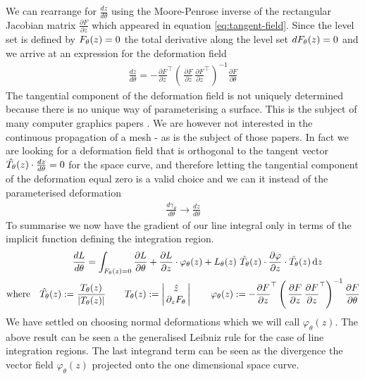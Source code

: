 We can rearrange for $\frac{d z}{d \theta}$ using the Moore-Penrose inverse of the rectangular Jacobian matrix $\frac{\partial F}{\partial z}$ which appeared in equation \eqref{eq:tangent-field}. Since the level set is defined by $F_{\theta}(z)=0$ the total derivative along the level set $dF_{\theta}(z)=0$ and we arrive at an expression for the deformation field \cite{Jos2011OnSurface}
\begin{align}
    \frac{d z}{d \theta} = - \frac{\partial F}{\partial z}^\top
    \left(\,
        \frac{\partial F}{\partial z}\,\frac{\partial F}{\partial z}^\top
    \right)^{-1}
    \frac{\partial F}{\partial\theta}
\end{align}
The tangential component of the deformation field is not uniquely determined because there is no unique way of parameterising a surface. This is the subject of many computer graphics papers \cite{Jos2011OnSurface,Tao2016Near-IsometricTracking,Fujisawa2013CalculationInvariance}. We are however not interested in the continuous propagation of a mesh - as is the subject of those papers. In fact we are looking for a deformation field that is orthogonal to the tangent vector $\hat{T_{\theta}}(z) \cdot\frac{d z}{d\theta} =0$ for the space curve, and therefore letting the tangential component of the deformation equal zero is a valid choice and we can it instead of the parameterised deformation
\begin{align}
    \frac{d \gamma_{\theta}}{d\theta} \rightarrow \frac{d z}{d\theta}
\end{align}
To summarise we now have the gradient of our line integral only in terms of the implicit function defining the integration region.
\begin{align}
    \frac{d L}{d\theta} =\int_{F_{\theta}(z)=0}
        \frac{\partial L}{\partial\theta}+
        \frac{\partial L}{\partial z}\cdot
        \varphi_{\theta}(z)
    +L_{\theta}(z)\,\,
    \hat{T_{\theta}}(z)\cdot\frac{\partial \varphi}{\partial z}\cdot\hat{T_{\theta}}(z)
    \,\mathrm{d}z\qquad\qquad\\
    \mathrm{where}\quad
    \hat{T_{\theta}}(z):= \frac{T_{\theta}(z)}{|T_{\theta}(z)|}
    \qquad
    T_{\theta}(z):=
    \left|\begin{matrix}
        \hat{z} \\
        \,\partial_{z}F_{\theta}\,
    \end{matrix}\right|
    \qquad
    \varphi_{\theta}(z) :=
- \frac{\partial F}{\partial z}^\top
    \left(\,
        \frac{\partial F}{\partial z}\,\frac{\partial F}{\partial z}^\top
    \right)^{-1}
    \frac{\partial F}{\partial\theta}
\end{align}
We have settled on choosing normal deformations which we will call $\varphi_\theta(z)$. The above result can be seen a the generalised Leibniz rule \cite{Flanders1973DifferentiationSign} for the case of line integration regions. The last integrand term can be seen as the divergence the vector field $\varphi_\theta(z)$ projected onto the one dimensional space curve.